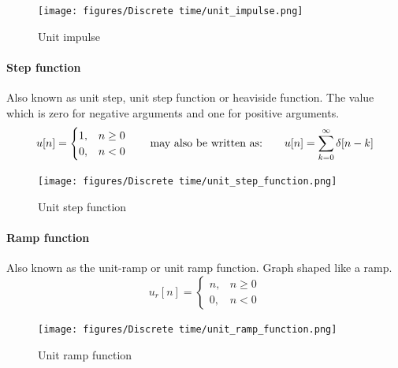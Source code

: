 \documentclass{article}
\begin{document}
\begin{figure}[h!]
    \centering
    \texttt{[image: figures/Discrete time/unit\_impulse.png]}
    \caption{Unit impulse}
    \label{fig:unit_impulse}
\end{figure}

\paragraph{Step function}
Also known as unit step, unit step function or heaviside function. The value which is zero for negative arguments and one for positive arguments.
\begin{equation}
    u[n] = \begin{cases}
        1, & n \geq 0 \\
        0, & n < 0
    \end{cases}
    \hspace*{20pt}\text{may also be written as:}
    \hspace*{20pt} u[n] = \sum_{k=0}^{\infty} \delta[n-k]
\end{equation}
\begin{figure}[h!]
    \centering
    \texttt{[image: figures/Discrete time/unit\_step\_function.png]}
    \caption{Unit step function}
    \label{fig:unit_step}
\end{figure}

\newpage
\paragraph{Ramp function}
Also known as the unit-ramp or unit ramp function. Graph shaped like a ramp.
\begin{equation}
u_r[n] = \begin{cases}
    n, & n \geq 0 \\
    0, & n < 0
\end{cases}
\end{equation}
\begin{figure}[h!]
    \centering
    \texttt{[image: figures/Discrete time/unit\_ramp\_function.png]}
    \caption{Unit ramp function}
    \label{fig:unit_ramp}
\end{figure}
\end{document}
